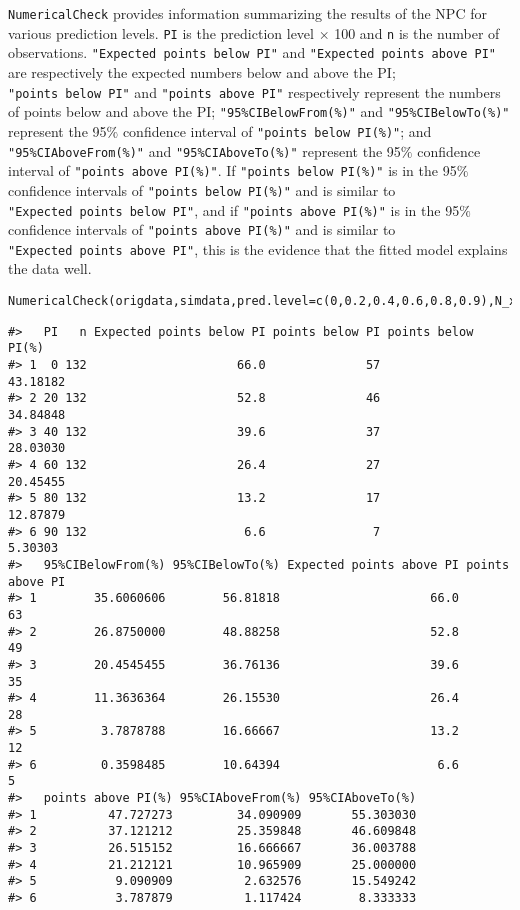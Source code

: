 \texttt{NumericalCheck} provides information summarizing the results of the NPC for various prediction levels.
\texttt{PI} is the prediction level \(\times\) 100 and \texttt{n} is the number of observations.
\texttt{"Expected\ points\ below\ PI"} and \texttt{"Expected\ points\ above\ PI"} are respectively the expected numbers below and above the PI; \texttt{"points\ below\ PI"} and \texttt{"points\ above\ PI"} respectively represent the numbers of points below and above the PI;
\texttt{"95\%CIBelowFrom(\%)"} and \texttt{"95\%CIBelowTo(\%)"} represent the 95\(\%\) confidence interval of \texttt{"points\ below\ PI(\%)"}; and \texttt{"95\%CIAboveFrom(\%)"} and \texttt{"95\%CIAboveTo(\%)"} represent the 95\(\%\) confidence interval of \texttt{"points\ above\ PI(\%)"}. If \texttt{"points\ below\ PI(\%)"} is in the
95\(\%\) confidence intervals of \texttt{"points\ below\ PI(\%)"} and is similar to \texttt{"Expected\ points\ below\ PI"}, and if
\texttt{"points\ above\ PI(\%)"} is in the
95\(\%\) confidence intervals of \texttt{"points\ above\ PI(\%)"} and is similar to \texttt{"Expected\ points\ above\ PI"}, this is the evidence that the fitted model explains the data well.

\begin{verbatim}
NumericalCheck(origdata,simdata,pred.level=c(0,0.2,0.4,0.6,0.8,0.9),N_xbin=8)$NPC
\end{verbatim}

\begin{verbatim}
#>   PI   n Expected points below PI points below PI points below PI(%)
#> 1  0 132                     66.0              57           43.18182
#> 2 20 132                     52.8              46           34.84848
#> 3 40 132                     39.6              37           28.03030
#> 4 60 132                     26.4              27           20.45455
#> 5 80 132                     13.2              17           12.87879
#> 6 90 132                      6.6               7            5.30303
#>   95%CIBelowFrom(%) 95%CIBelowTo(%) Expected points above PI points above PI
#> 1        35.6060606        56.81818                     66.0              63
#> 2        26.8750000        48.88258                     52.8              49
#> 3        20.4545455        36.76136                     39.6              35
#> 4        11.3636364        26.15530                     26.4              28
#> 5         3.7878788        16.66667                     13.2              12
#> 6         0.3598485        10.64394                      6.6               5
#>   points above PI(%) 95%CIAboveFrom(%) 95%CIAboveTo(%)
#> 1          47.727273         34.090909       55.303030
#> 2          37.121212         25.359848       46.609848
#> 3          26.515152         16.666667       36.003788
#> 4          21.212121         10.965909       25.000000
#> 5           9.090909          2.632576       15.549242
#> 6           3.787879          1.117424        8.333333
\end{verbatim}

